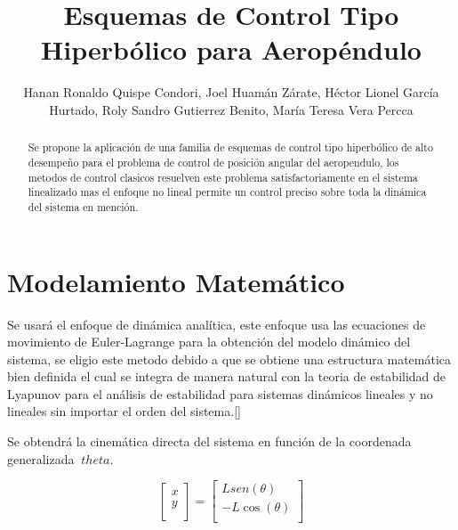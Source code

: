 \documentclass[a4paper]{IEEEtran} %
\begin{document}
\title{Esquemas de Control Tipo Hiperbólico para Aeropéndulo}
\author{Hanan Ronaldo Quispe Condori, Joel Huamán Zárate, Héctor Lionel García Hurtado, Roly Sandro Gutierrez Benito, María Teresa Vera Percca}
\maketitle
\begin{abstract}
    Se propone la aplicación de una familia de esquemas de control tipo hiperbólico de alto desempeño para el problema de control de posición angular del aeropendulo, los metodos de control clasicos resuelven este problema satisfactoriamente en el sistema linealizado mas el enfoque no lineal permite un control preciso sobre toda la dinámica del sistema en mención.
\end{abstract}
\section{Modelamiento Matemático}
\label{sec:modeling}
Se usará el enfoque de dinámica analítica, este enfoque usa las ecuaciones de movimiento de Euler-Lagrange para la obtención del modelo dinámico del sistema, se eligio este metodo debido a que se obtiene una estructura matemática bien definida el cual se integra de manera natural con la teoria de estabilidad de Lyapunov para el análisis de estabilidad para sistemas dinámicos lineales y no lineales sin importar el orden del sistema.[\cite{reyes2019drones}]

Se obtendrá la cinemática directa del sistema en función de la coordenada generalizada $\  theta$.

\begin{equation}
    \begin{bmatrix}  x \\ y \\
    \end{bmatrix}=
    \begin{bmatrix} Lsen(\theta) \\ -L\cos(\theta)  \\
    \end{bmatrix}
    \label{eq:cin_direc}
\end{equation}
\end{document}

